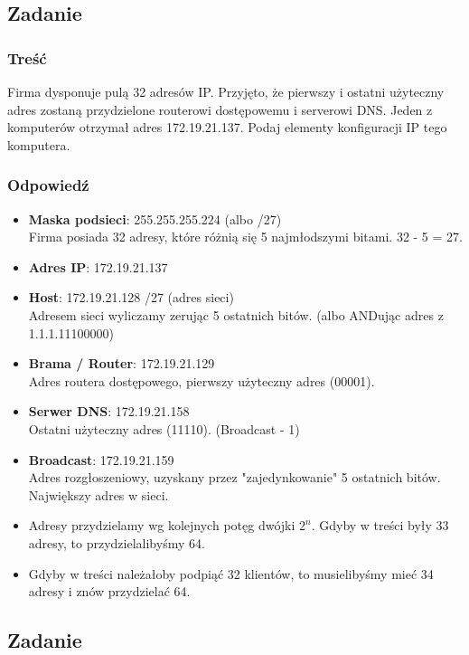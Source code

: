 \newpage
	\subsection{Zadanie}
		\subsubsection{Treść}
			Firma dysponuje pulą 32 adresów IP. Przyjęto, że pierwszy i ostatni użyteczny adres zostaną przydzielone routerowi dostępowemu i serverowi DNS. Jeden z komputerów otrzymał adres 172.19.21.137. Podaj elementy konfiguracji IP tego komputera.
		\subsubsection{Odpowiedź}
			\begin{itemize}
				\item \textbf{Maska podsieci}: 255.255.255.224 (albo /27)\\
				Firma posiada 32 adresy, które różnią się 5 najmłodszymi bitami. 32 - 5 = 27.
				\item \textbf{Adres IP}: 172.19.21.137
				\item \textbf{Host}: 172.19.21.128 /27 (adres sieci)\\
				Adresem sieci wyliczamy zerując 5 ostatnich bitów. (albo ANDując adres z 1.1.1.11100000)
				\item \textbf{Brama / Router}: 172.19.21.129\\
				Adres routera dostępowego, pierwszy użyteczny adres (00001).
				\item \textbf{Serwer DNS}: 172.19.21.158\\
				Ostatni użyteczny adres (11110). (Broadcast - 1)
				\item \textbf{Broadcast}: 172.19.21.159\\
				Adres rozgłoszeniowy, uzyskany przez "zajedynkowanie" 5 ostatnich bitów. Największy adres w sieci.
				\item Adresy przydzielamy wg kolejnych potęg dwójki $ 2^n $. Gdyby w treści były 33 adresy, to przydzielalibyśmy 64.
				\item Gdyby w treści należałoby podpiąć 32 klientów, to musielibyśmy mieć 34 adresy i znów przydzielać 64.
			\end{itemize}
	\subsection{Zadanie}
